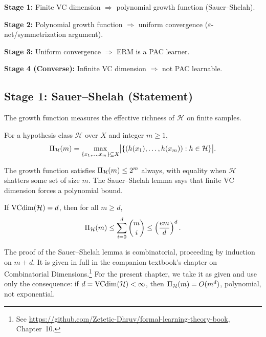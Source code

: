 \bigskip
\noindent\textbf{Stage 1:} Finite VC dimension $\Longrightarrow$ polynomial
growth function (Sauer--Shelah).

\noindent\textbf{Stage 2:} Polynomial growth function $\Longrightarrow$
uniform convergence ($\varepsilon$-net/symmetrization argument).

\noindent\textbf{Stage 3:} Uniform convergence $\Longrightarrow$ ERM is a
PAC learner.

\noindent\textbf{Stage 4 (Converse):} Infinite VC dimension
$\Longrightarrow$ not PAC learnable.



\subsection{Stage 1: Sauer--Shelah (Statement)}
\label{sec:sauer-shelah}

The growth function measures the effective richness of $\mathcal{H}$ on finite
samples.

\begin{defn}
\label{def:growth-function}
For a hypothesis class $\mathcal{H}$ over $X$ and integer $m \geq 1$,
\[
  \Pi_\mathcal{H}(m) = \max_{\{x_1, \ldots, x_m\} \subseteq X}
  \bigl|\{(h(x_1), \ldots, h(x_m)) : h \in \mathcal{H}\}\bigr|.
\]
\end{defn}

The growth function satisfies $\Pi_\mathcal{H}(m) \leq 2^m$ always, with
equality when $\mathcal{H}$ shatters some set of size $m$.  The Sauer--Shelah
lemma says that finite VC dimension forces a polynomial bound.

\begin{lemma}
\label{lem:sauer-shelah}
  \leanok
If $\mathrm{VCdim}(\mathcal{H}) = d$, then for all $m \geq d$,
\[
  \Pi_\mathcal{H}(m)
  \leq \sum_{i=0}^d \binom{m}{i}
  \leq \left(\frac{em}{d}\right)^d.
\]
\end{lemma}

The proof of the Sauer--Shelah lemma is combinatorial, proceeding by induction
on $m + d$.  It is given in full in the companion textbook's chapter on
Combinatorial Dimensions.\footnote{See \url{https://github.com/Zetetic-Dhruv/formal-learning-theory-book}, Chapter~10.}
For the present chapter, we take it as given
and use only the consequence: if $d = \mathrm{VCdim}(\mathcal{H}) < \infty$, then
$\Pi_\mathcal{H}(m) = O(m^d)$, polynomial, not exponential.


